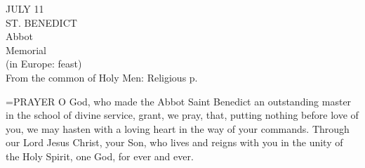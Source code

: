 \begin{center}\normalsize JULY 11\\
\footnotesize ST. BENEDICT\\
\footnotesize Abbot\\
\footnotesize Memorial\\
\footnotesize (in Europe: feast)\\
\footnotesize From the common of Holy Men: Religious p. \\
\end{center}

\hangindent=\parindent \small{PRAYER 
O God, who made the Abbot Saint Benedict
an outstanding master in the school of divine service,
grant, we pray,
that, putting nothing before love of you,
we may hasten with a loving heart
in the way of your commands.
Through our Lord Jesus Christ, your Son,
who lives and reigns with you in the unity of the Holy Spirit,
one God, for ever and ever.\\}
 
